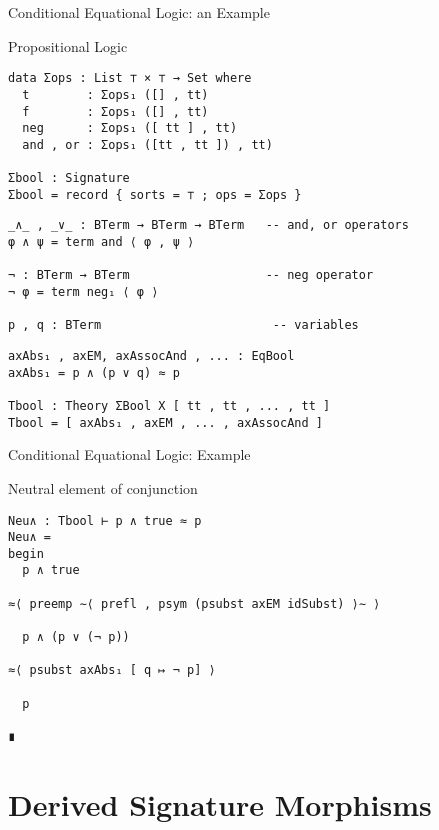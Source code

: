 \documentclass[11pt]{beamer}
\begin{document}
\begin{frame}[fragile]{Conditional Equational Logic: an Example}

  \begin{block}{Propositional Logic}
    \begin{verbatim}
data Σops : List ⊤ × ⊤ → Set where
  t        : Σops₁ ([] , tt)
  f        : Σops₁ ([] , tt)
  neg      : Σops₁ ([ tt ] , tt)
  and , or : Σops₁ ([tt , tt ]) , tt)

Σbool : Signature
Σbool = record { sorts = ⊤ ; ops = Σops }
\end{verbatim}
%
\pause
%    
\begin{verbatim}
_∧_ , _∨_ : BTerm → BTerm → BTerm   -- and, or operators
φ ∧ ψ = term and ⟨ φ , ψ ⟩
  
¬ : BTerm → BTerm                   -- neg operator
¬ φ = term neg₁ ⟨ φ ⟩   

p , q : BTerm                        -- variables
\end{verbatim}
\pause
\begin{verbatim}
axAbs₁ , axEM, axAssocAnd , ... : EqBool
axAbs₁ = p ∧ (p ∨ q) ≈ p

Tbool : Theory ΣBool X [ tt , tt , ... , tt ]
Tbool = [ axAbs₁ , axEM , ... , axAssocAnd ]
\end{verbatim}
    
\end{block}
\end{frame}

\begin{frame}[fragile]{Conditional Equational Logic: Example}

\begin{block}{Neutral element of conjunction}
\begin{verbatim}
Neu∧ : Tbool ⊢ p ∧ true ≈ p
Neu∧ =
begin
  p ∧ true

≈⟨ preemp ∼⟨ prefl , psym (psubst axEM idSubst) ⟩∼ ⟩

  p ∧ (p ∨ (¬ p))

≈⟨ psubst axAbs₁ [ q ↦ ¬ p] ⟩

  p

∎
\end{verbatim}
\end{block}
\end{frame}



\section{Derived Signature Morphisms}
\end{document}
